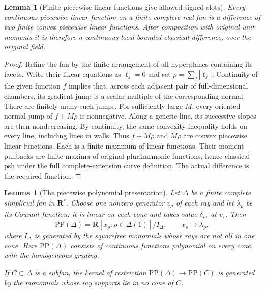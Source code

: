 \documentclass[11pt,a4paper]{article}
\numberwithin{equation}{section}
\newtheorem{lemma}[theorem]{Lemma}
\theoremstyle{definition}
\theoremstyle{remark}
\begin{document}
\begin{lemma}[Finite piecewise linear functions give allowed signed slots]
\label{lem:r6-pl-difference-convex}
Every continuous piecewise linear function on a finite
complete real fan is a difference of two finite convex
piecewise linear functions. After composition with original
unit moments it is therefore a continuous local bounded
classical difference, over the original field.
\end{lemma}

\begin{proof}
Refine the fan by the finite arrangement of all hyperplanes
containing its facets. Write their linear equations as
$\ell_j=0$ and set $\rho=\sum_j|\ell_j|$.
Continuity of the given function $f$ implies that, across
each adjacent pair of full-dimensional chambers, its
gradient jump is a scalar multiple of the corresponding
normal. There are finitely many such jumps. For sufficiently
large $M$, every oriented normal jump of $f+M\rho$ is
nonnegative. Along a generic line, its successive slopes
are then nondecreasing. By continuity, the same convexity
inequality holds on every line, including lines in walls.
Thus $f+M\rho$ and $M\rho$ are convex piecewise linear
functions. Each is a finite maximum of linear functions.
Their moment pullbacks are finite maxima of original
pluriharmonic functions, hence classical psh under the
full complete-extension curve definition. The actual
difference is the required function.
\end{proof}

\begin{lemma}[The piecewise polynomial presentation]
\label{lem:r6-stanley-reisner-presentation}
Let $\Delta$ be a finite complete simplicial fan in
$\mathbf R^r$. Choose one nonzero generator $v_\rho$ of
each ray and let $\lambda_\rho$ be its Courant function:
it is linear on each cone and takes value
$\delta_{\rho\tau}$ at $v_\tau$. Then
\[
 \mathrm{PP}(\Delta)
     =\mathbf R[x_\rho:\rho\in\Delta(1)]/I_\Delta,
 \qquad x_\rho\longmapsto\lambda_\rho,
\]
where $I_\Delta$ is generated by the squarefree monomials
whose rays are not all in one cone. Here
$\mathrm{PP}(\Delta)$ consists of continuous functions
polynomial on every cone, with the homogeneous grading.

If $C\subset\Delta$ is a subfan, the kernel of restriction
$\mathrm{PP}(\Delta)\to\mathrm{PP}(C)$ is generated by
the monomials whose ray supports lie in no cone of $C$.
\end{lemma}
\end{document}
